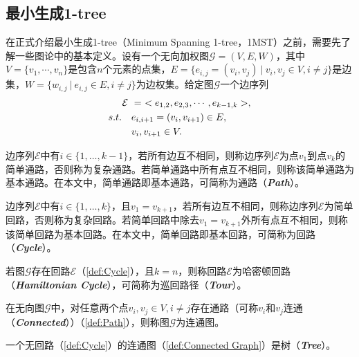 \subsection{最小生成1-tree}
\label{subsec:NS_Method:相关定义与基本概念:最小生成1-tree}
在正式介绍最小生成1-tree（Minimum Spanning 1-tree，1MST）之前，需要先了解一些图论中的基本定义。设有一个无向加权图$\mathcal{G} = (V, E, W)$，其中$V = \{ v_1, \cdots, v_n \}$是包含$n$个元素的点集，$E = \{ e_{i,j} = (v_i,v_j) \ | \ v_i,v_j \in V, i \not = j \}$是边集，$W = \{ w_{i,j} \ | \ e_{i,j} \in E, i \not = j\} $为边权集。给定图$\mathcal{G}$一个边序列
\begin{align}
    \label{eq:边序列}
    \mathcal{E} \ & = \ <e_{1,2}, e_{2,3}, \cdots, e_{k-1,k}>, \\
    s.t. \quad & e_{i,i+1} = (v_i, v_{i+1}) \in E, \notag  \\
    & v_i, v_{i+1} \in V. \notag 
\end{align}
\begin{definition}[简单通路]
    \label{def:Path}
    边序列$\mathcal{E}$中有$i \in \{ 1, \dots, k-1 \}$，若所有边互不相同，则称边序列$\mathcal{E}$为点$v_1$到点$v_k$的简单通路，否则称为复杂通路。若简单通路中所有点互不相同，则称该简单通路为基本通路。在本文中，简单通路即基本通路，可简称为通路（\emph{\textbf{Path}}）。
\end{definition}
\begin{definition}[简单回路]
    \label{def:Cycle}
    边序列$\mathcal{E}$中有$i \in \{ 1, \dots, k \}$，且$v_1=v_{k+1}$，若所有边互不相同，则称边序列$\mathcal{E}$为简单回路，否则称为复杂回路。若简单回路中除去$v_1=v_{k+1}$外所有点互不相同，则称该简单回路为基本回路。在本文中，简单回路即基本回路，可简称为回路（\emph{\textbf{Cycle}}）。
\end{definition}
\begin{definition}[哈密顿回路]
    \label{def:Hamiltonian Cycle}
    若图$\mathcal{G}$存在回路$\mathcal{E}$（\autoref{def:Cycle}），且$k=n$，则称回路$\mathcal{E}$为哈密顿回路（\emph{\textbf{Hamiltonian Cycle}}），可简称为巡回路径（\emph{\textbf{Tour}}）。
\end{definition}
\begin{definition}[连通图]
    \label{def:Connected Graph}
    在无向图$\mathcal{G}$中，对任意两个点$v_i, v_j \in V, i \not = j$存在通路（可称$v_i$和$v_j$连通（\emph{\textbf{Connected}}））（\autoref{def:Path}），则称图$\mathcal{G}$为连通图。
\end{definition}
\begin{definition}[树]
    \label{def:Tree}
    一个无回路（\autoref{def:Cycle}）的连通图（\autoref{def:Connected Graph}）是树（\emph{\textbf{Tree}}）。
\end{definition}
